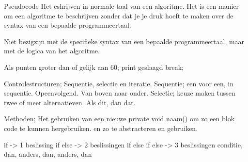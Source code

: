 Pseudocode
Het cshrijven in normale taal van een algoritme. Het is een manier om een algoritme te beschrijven zonder dat je je druk hoeft te maken over de syntax van een bepaalde programmeertaal.

Niet bezigzijn met de specifieke syntax van een bepaalde programmeertaal, maar met de logica van het algoritme.

Als punten groter dan of gelijk aan 60;
	print geslaagd
break;

Controlestructuren;
Sequentie, selectie en iteratie.
Sequentie; een voor een, in sequentie. Opeenvolgend. Van boven naar onder.
Selectie; keuze maken tussen twee of meer alternatieven. Als dit, dan dat.

Methoden;
Het gebruiken van een nieuwe private void naam()
om zo een blok code te kunnen hergebruiken. en zo te abstracteren en gebruiken.

if -> 1 beslissing
if else -> 2 beslissingen
if else if else -> 3 beslissingen
conditie, dan, anders, dan, anders, dan

